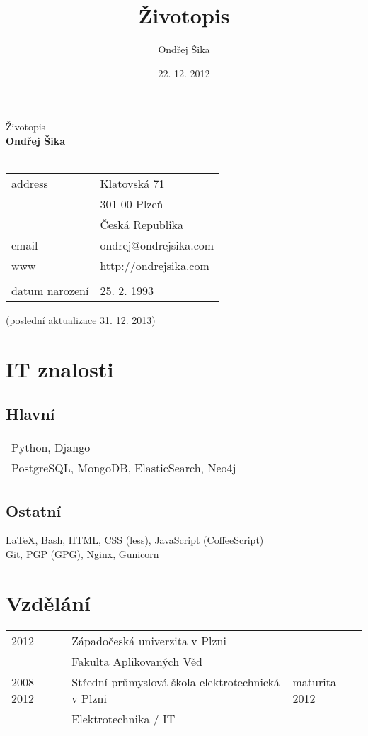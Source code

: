 \documentclass[12pt,a4paper]{article}
\title{Životopis}
\author{Ondřej Šika}
\date{22. 12. 2012}
\begin{document}
\begin{center}
{\Large Životopis}\\
\vspace*{1cm}
{\LARGE \bf Ondřej Šika}\\
\hrulefill\\
\vspace*{0.2cm}
\begin{tabular}{l l}
address & Klatovská 71\\
 & 301 00 Plzeň\\
 & Česká Republika\\
email & ondrej@ondrejsika.com\\
www & http://ondrejsika.com\\
\\
datum narození & 25. 2. 1993\\
\end{tabular}

\vspace*{0.2cm}
{\small (poslední aktualizace 31. 12. 2013)}
\end{center}

\section*{IT znalosti}
\subsection*{Hlavní}
\begin{tabular}{@{}ll}
Python, Django & \\
PostgreSQL, MongoDB, ElasticSearch, Neo4j & \\
\end{tabular}

\subsection*{Ostatní}
LaTeX, Bash, HTML, CSS (less), JavaScript (CoffeeScript)\\
Git, PGP (GPG), Nginx, Gunicorn\\

\section*{Vzdělání}
\begin{tabular}{@{}p{2cm}ll}
2012 & Západočeská univerzita v Plzni & \\
 & Fakulta Aplikovaných Věd & \\
2008 - 2012 & Střední průmyslová škola elektrotechnická v Plzni & maturita 2012\\
 & Elektrotechnika / IT & \\
\end{tabular}
\end{document}
